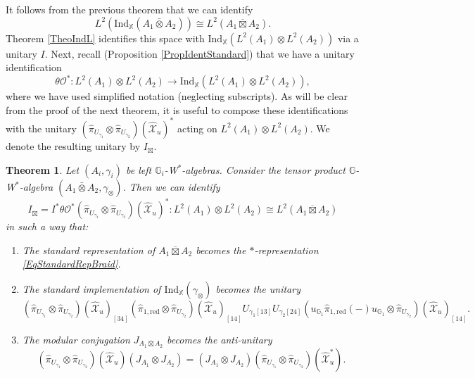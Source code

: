 \documentclass[reqno]{amsart}
\numberwithin{equation}{section}
\newtheorem{Theorem}{Theorem}[section]
\newcommand{\G}{\mathbb{G}}
\newcommand{\X}{\mathbb{X}}
\newcommand{\Ind}{\mathrm{Ind}}
\newcommand{\mcX}{\mathcal{X}}
\newcommand{\red}{\mathrm{red}}
\newcommand{\ov}{\overline}
\newcommand{\mc}{\mathcal}
\newcommand{\wh}{\widehat}
\begin{document}
It follows from the previous theorem that we can identify 
\[
L^2(\Ind_{\X}(A_1\bar\otimes A_2))\cong L^2(A_1\ov\boxtimes A_2).
\] 
Theorem \ref{TheoIndL} identifies this space with $\Ind_{\X}(L^2(A_1)\otimes L^2(A_2))$ via a unitary $I$. Next, recall (Proposition \ref{PropIdentStandard}) that we have a unitary identification 
\[
\theta\mc{O}^*\colon L^2(A_1)\otimes L^2(A_2)\rightarrow \Ind_{\X}(L^2(A_1)\otimes L^2(A_2)),
\] 
where we have used simplified notation (neglecting subscripts). As will be clear from the proof of the next theorem, it is useful to compose these identifications with the unitary $
(\hat{\pi}_{U_{\gamma_1}}\otimes \hat{\pi}_{U_{\gamma_2}})(\wh{\mc{X}}_u)^*$ acting on $L^2(A_1)\otimes L^2(A_2)$. We denote the resulting unitary by $I_\boxtimes$.

\begin{Theorem}\label{TheoInductionBraided}
Let $(A_i,\gamma_i)$ be left $\G_i$-W$^*$-algebras. Consider the tensor product $\G$-W$^*$-algebra $ (A_1\bar{\otimes}A_2,\gamma_{\otimes})$. Then we can identify 
\begin{equation}\label{EqIdentificationMain}
I_{\boxtimes}= I^*\theta\mc{O}^*
(\hat{\pi}_{U_{\gamma_1}}\otimes \hat{\pi}_{U_{\gamma_2}})(\wh{\mc{X}}_u)^*
\colon L^2(A_1)\otimes L^2(A_2)\cong L^2(A_1\ov{\boxtimes} A_2)
\end{equation}
in such a way that:
\begin{enumerate}
\item The standard representation of $A_1\ov{\boxtimes} A_2$ becomes the $*$-representation \eqref{EqStandardRepBraid}.
\item The standard implementation of $\Ind_{\X}(\gamma_{\otimes})$ becomes the unitary
\[
(\hat{\pi}_{U_{\gamma_1}}\otimes \hat{\pi}_{U_{\gamma_2}})( \wh{\mc{X}}_u)_{[34]}
(\hat{\pi}_{1,\red}\otimes \hat{\pi}_{U_{\gamma_2 }})(\wh{\mc{X}}_u)_{[14]}
U_{\gamma_1 [13]}
U_{\gamma_2 [24]}
(u_{\G_1}\hat{\pi}_{1,\red}(-)u_{\G_1}\otimes \hat{\pi}_{U_{\gamma_2}})
(\wh{\mc{X}}_{u})_{[14]}.
\]
\item The modular conjugation $J_{A_1\ov\boxtimes A_2}$ becomes the anti-unitary
\begin{equation}\label{EqMainFormModConj}
(\hat{\pi}_{U_{\gamma_1}}\otimes \hat{\pi}_{U_{\gamma_2}})(\wh{\mcX}_u)(J_{A_1}\otimes J_{A_2}) = (J_{A_1}\otimes J_{A_2})(\hat{\pi}_{U_{\gamma_1}}\otimes \hat{\pi}_{U_{\gamma_2}})(\wh{\mcX}_u^*).
\end{equation}
\end{enumerate}
\end{Theorem}
\end{document}

